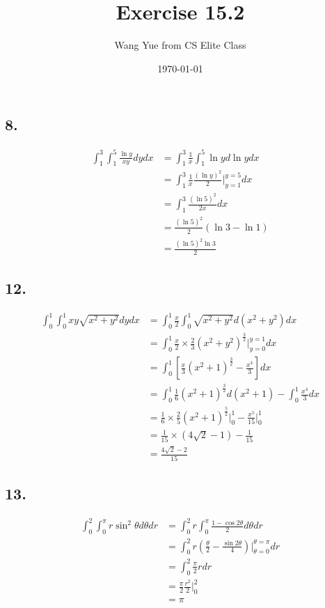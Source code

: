 \documentclass{article}
\begin{document}
  \title{Exercise 15.2}
  \author{Wang Yue from CS Elite Class}
  \date{\today}
  \maketitle

  \subsection*{8. }

  $$\begin{aligned}
    \int_1^3 \int_1^5 \frac{\ln y}{xy} dy dx &= \int_1^3 \frac 1 x \int_1^5 \ln y d\ln y dx \\
    &= \int_1^3 \frac 1 x \frac{(\ln y)^2}{2}\biggl|_{y=1}^{y=5} dx \\
    &= \int_1^3 \frac{(\ln 5)^2}{2x} dx \\
    &= \frac{(\ln 5)^2}{2}(\ln 3 - \ln 1) \\
    &= \frac{(\ln 5)^2\ln 3}{2}
  \end{aligned}$$

  \subsection*{12. }

  $$\begin{aligned}
    \int_0^1 \int_0^1 xy \sqrt{x^2+y^2} dy dx &= \int_0^1 \frac x 2 \int_0^1 \sqrt{x^2+y^2} d(x^2+y^2) dx\\
    &= \int_0^1 \frac x 2 \times \frac 2 3 (x^2+y^2)^{\frac 3 2}\biggl|_{y=0}^{y=1} dx \\
    &= \int_0^1 [\frac x 3 (x^2+1)^{\frac 3 2} - \frac{x^4}{3}] dx \\
    &= \int_0^1 \frac 1 6 (x^2+1)^{\frac 3 2} d(x^2+1) - \int_0^1 \frac{x^4}{3} dx \\
    &= \frac 1 6 \times \frac 2 5 (x^2+1)^{\frac 5 2}\biggl|_0^1 - \frac{x^5}{15}\biggl|_0^1 \\
    &= \frac{1}{15} \times (4\sqrt 2 - 1) - \frac{1}{15} \\
    &= \frac{4\sqrt 2 - 2}{15}
  \end{aligned}$$

  \subsection*{13. }

  $$\begin{aligned}
    \int_0^2 \int_0^\pi r\sin^2 \theta d\theta dr &= \int_0^2 r \int_0^\pi \frac{1 - \cos 2\theta}{2} d\theta dr \\
    &= \int_0^2 r (\frac \theta 2 - \frac{\sin 2\theta}{4})\biggl|_{\theta=0}^{\theta=\pi}dr \\
    &= \int_0^2 \frac \pi 2 r dr \\
    &= \frac{\pi}{2} \frac{r^2}{2} \biggl|_0^2 \\
    &= \pi
  \end{aligned}$$
\end{document}
